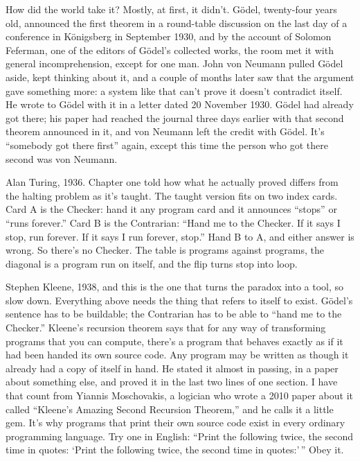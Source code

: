 \documentclass[11pt,twoside]{article}
\theoremstyle{thielethm}
\theoremstyle{thieledef}
\theoremstyle{thieledef}
\theoremstyle{thieledef}
\theoremstyle{thielethm}
\theoremstyle{thieleobs}
\theoremstyle{thielethm}
\begin{document}
How did the world take it? Mostly, at first, it didn't. Gödel, twenty-four years old, announced the first theorem in a round-table discussion on the last day of a conference in Königsberg in September 1930, and by the account of Solomon Feferman, one of the editors of Gödel's collected works, the room met it with general incomprehension, except for one man. John von Neumann pulled Gödel aside, kept thinking about it, and a couple of months later saw that the argument gave something more: a system like that can't prove it doesn't contradict itself. He wrote to Gödel with it in a letter dated 20 November 1930. Gödel had already got there; his paper had reached the journal three days earlier with that second theorem announced in it, and von Neumann left the credit with Gödel. It's ``somebody got there first'' again, except this time the person who got there second was von Neumann.

Alan Turing, 1936. Chapter one told how what he actually proved differs from the halting problem as it's taught. The taught version fits on two index cards. Card A is the Checker: hand it any program card and it announces ``stops'' or ``runs forever.'' Card B is the Contrarian: ``Hand me to the Checker. If it says I stop, run forever. If it says I run forever, stop.'' Hand B to A, and either answer is wrong. So there's no Checker. The table is programs against programs, the diagonal is a program run on itself, and the flip turns stop into loop.

Stephen Kleene, 1938, and this is the one that turns the paradox into a tool, so slow down. Everything above needs the thing that refers to itself to exist. Gödel's sentence has to be buildable; the Contrarian has to be able to ``hand me to the Checker.'' Kleene's recursion theorem says that for any way of transforming programs that you can compute, there's a program that behaves exactly as if it had been handed its own source code. Any program may be written as though it already had a copy of itself in hand. He stated it almost in passing, in a paper about something else, and proved it in the last two lines of one section. I have that count from Yiannis Moschovakis, a logician who wrote a 2010 paper about it called ``Kleene's Amazing Second Recursion Theorem,'' and he calls it a little gem. It's why programs that print their own source code exist in every ordinary programming language. Try one in English: ``Print the following twice, the second time in quotes: `Print the following twice, the second time in quotes:'\,'' Obey it.
\end{document}
